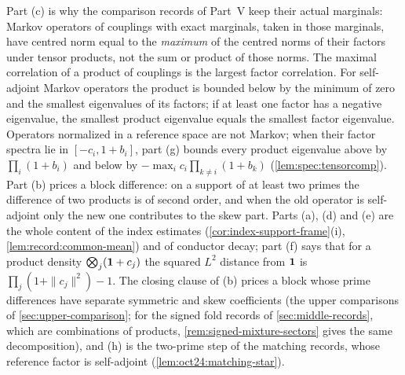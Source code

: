 \begin{remark}\label{rem:sector-uses}
Part (c) is why the comparison records of Part~V keep their actual marginals:
Markov operators of couplings with exact marginals, taken in those marginals,
have centred norm equal to the \emph{maximum} of the centred norms of their
factors under tensor products, not the sum or product of those norms. The maximal correlation of a product of couplings is the
largest factor correlation. For self-adjoint Markov operators the product
is bounded below by the minimum of zero and the smallest eigenvalues of
its factors; if at least one factor has a negative eigenvalue, the smallest
product eigenvalue equals the smallest factor eigenvalue. Operators normalized in a
reference space are not Markov; when their factor spectra lie in
$[-c_i,1+b_i]$, part (g) bounds every product eigenvalue above by
$\prod_i(1+b_i)$ and below by $-\max_i c_i\prod_{k\ne i}(1+b_k)$
(\cref{lem:spec:tensorcomp}). Part (b) prices a block difference: on a support
of at least two primes the difference of two products is of second order, and
when the old operator is self-adjoint only the new one contributes to the skew
part. Parts (a), (d) and (e) are the whole content of the index estimates
(\cref{cor:index-support-frame}(i), \cref{lem:record:common-mean}) and of
conductor decay; part
(f) says that for a product density $\bigotimes_j(\mathbf 1+c_j)$ the
squared $L^2$ distance from $\mathbf 1$ is
$\prod_j(1+\|c_j\|^2)-1$. The closing
clause of (b) prices a block whose prime differences have separate symmetric
and skew coefficients (the upper comparisons of \cref{sec:upper-comparison};
for the signed fold records of \cref{sec:middle-records}, which are
combinations of products, \cref{rem:signed-mixture-sectors} gives the same
decomposition), and (h) is the two-prime step of the matching records, whose
reference factor is self-adjoint (\cref{lem:oct24:matching-star}).
\end{remark}

